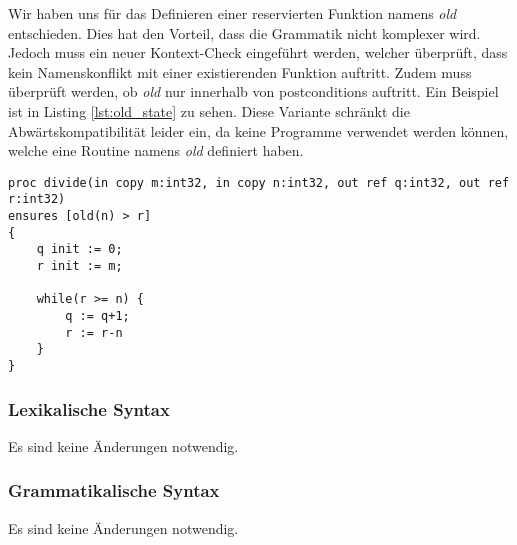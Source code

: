 Wir haben uns für das Definieren einer reservierten Funktion namens \textit{old} 
entschieden. Dies hat den Vorteil, dass die Grammatik nicht komplexer wird. Jedoch 
muss ein neuer Kontext-Check eingeführt werden, welcher überprüft, dass kein Namenskonflikt
mit einer existierenden Funktion auftritt. Zudem muss überprüft werden, ob \textit{old} 
nur innerhalb von postconditions auftritt. Ein Beispiel ist in Listing \ref{lst:old_state} zu sehen.
Diese Variante schränkt die Abwärtskompatibilität leider ein, da keine Programme verwendet 
werden können, welche eine Routine namens \textit{old} definiert haben.
\begin{lstlisting}[caption=Beispiel eines Zugriffs auf alten Zustand,label={lst:old_state}]
proc divide(in copy m:int32, in copy n:int32, out ref q:int32, out ref r:int32)
ensures [old(n) > r]
{
    q init := 0;
    r init := m;

    while(r >= n) {
        q := q+1;
        r := r-n
    }
}
\end{lstlisting}

\subsubsection{Lexikalische Syntax}
Es sind keine Änderungen notwendig.

\subsubsection{Grammatikalische Syntax}
Es sind keine Änderungen notwendig.


\newpage
